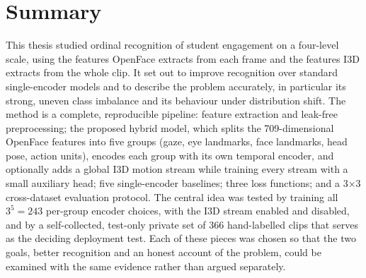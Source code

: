 \documentclass[../main.tex]{subfiles}
\begin{document}
\FloatBarrier
\section{Summary}
\label{sec:summary}

This thesis studied ordinal recognition of student engagement on a four-level scale, using the features OpenFace extracts from each frame and the features I3D extracts from the whole clip. It set out to improve recognition over standard single-encoder models and to describe the problem accurately, in particular its strong, uneven class imbalance and its behaviour under distribution shift. The method is a complete, reproducible pipeline: feature extraction and leak-free preprocessing; the proposed hybrid model, which splits the 709-dimensional OpenFace features into five groups (gaze, eye landmarks, face landmarks, head pose, action units), encodes each group with its own temporal encoder, and optionally adds a global I3D motion stream while training every stream with a small auxiliary head; five single-encoder baselines; three loss functions; and a 3$\times$3 cross-dataset evaluation protocol. The central idea was tested by training all $3^5=243$ per-group encoder choices, with the I3D stream enabled and disabled, and by a self-collected, test-only private set of 366 hand-labelled clips that serves as the deciding deployment test. Each of these pieces was chosen so that the two goals, better recognition and an honest account of the problem, could be examined with the same evidence rather than argued separately.
\end{document}
